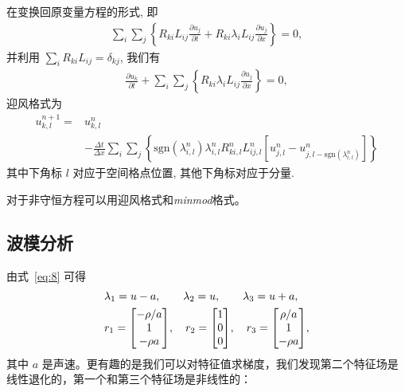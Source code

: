 \documentclass[10.5pt
]{article}
\begin{document}
在变换回原变量方程的形式, 即
\begin{align}
\sum_i \sum_j \left\{R_{ki} L_{ij} \frac{\partial u_j}{\partial t} + R_{ki} \lambda_i L_{ij}
\frac{\partial u_j}{\partial x}\right\} = 0,
\end{align}
并利用 $\sum_i R_{ki} L_{ij} = \delta_{kj}$, 我们有
\begin{align}
\frac{\partial u_k}{\partial t} + \sum_i \sum_j \left\{R_{ki} \lambda_i L_{ij} \frac{\partial
u_j}{\partial x}\right\} = 0,
\end{align}
迎风格式为
\begin{align}
u_{k,l}^{n+1} =& u_{k,l}^n \nonumber\\
& - \frac{\Delta t}{\Delta x} \sum_i \sum_j \left\{\text{sgn}(\lambda_{i,l}^n)
 \lambda_{i,l}^n R_{ki,l}^n L_{ij,l}^n \left[u_{j,l}^n - u_{j,l-\text{sgn}(\lambda_{i,l}^n)}^n\right]\right\}
\end{align}
其中下角标 $l$ 对应于空间格点位置, 其他下角标对应于分量.

对于非守恒方程可以用迎风格式和\textit{minmod}格式。

\subsection{波模分析}
由式~\eqref{eq:8} 可得
\begin{equation}
	\begin{aligned}
		&\lambda_1 = u - a, \qquad \lambda_2  = u, \qquad \lambda_3 = u + a, \\
		&r_1 = \mqty[- \rho / a \\ 1 \\ -\rho a], \quad
		r_2 = \mqty[1 \\ 0 \\ 0], \quad
		r_3 = \mqty[\rho / a \\ 1 \\ -\rho a],
	\end{aligned}
\end{equation}
其中 $a$ 是声速。更有趣的是我们可以对特征值求梯度，我们发现第二个特征场是线性退化的，第一个和第三个特征场是非线性的：
\end{document}
